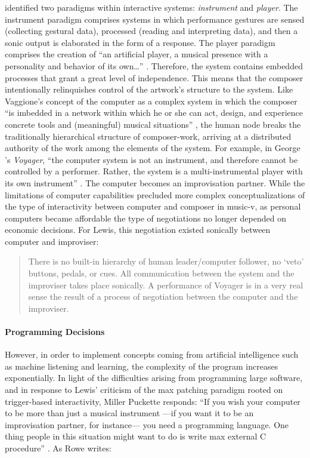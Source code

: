 \citeauthor{Row92:Int} \parencite{Row92:Int} identified two paradigms within interactive systems: \textit{instrument} and \textit{player}. The instrument paradigm comprises systems in which performance gestures are sensed (collecting gestural data), processed (reading and interpreting data), and then a sonic output is elaborated in the form of a response. The player paradigm comprises the creation of ``an artificial player, a musical presence with a personality and behavior of its own\dots'' \parencite[Chapter~1]{Row92:Int}. Therefore, the system contains embedded processes that grant a great level of independence. This means that the composer intentionally relinquishes control of the artwork's structure to the system. Like Vaggione's concept of the computer as a complex system in which the composer ``is imbedded in a network within which he or she can act, design, and experience concrete tools and (meaningful) musical situations'' \parencite{Vag01:Som}, the human node breaks the traditionally hierarchical structure of composer-work, arriving at a distributed authority of the work among the elements of the system. For example, in George \textcite{Lew99:Int}'s \textit{Voyager}, ``the computer system is not an instrument, and therefore cannot be controlled by a performer. Rather, the system is a multi-instrumental player with its own instrument'' \parencite[103]{Lew99:Int}. The computer becomes an improvisation partner. While the limitations of computer capabilities precluded more complex conceptualizations of the type of interactivity between computer and composer in \gls{music-v}, as personal computers became affordable the type of negotiations no longer depended on economic decisions. For Lewis, this  negotiation existed sonically between computer and improviser:

\begin{quote}
	There is no built-in hierarchy of human leader/computer follower, no `veto' buttons, pedals, or cues. All communication between the system and the improviser takes place sonically. A performance of Voyager is in a very real sense the result of a process of negotiation between the computer and the improviser. \parencite[104]{Lew99:Int}
\end{quote}

\paragraph{Programming Decisions}
However, in order to implement concepts coming from artificial intelligence such as machine listening and learning, the complexity of the program increases exponentially. In light of the difficulties arising from programming large software, and in response to Lewis' criticism of the \gls{max} patching paradigm rooted on trigger-based interactivity, Miller Puckette responds: ``If you wish your computer to be more than just a musical instrument ---if you want it to be an improvisation partner, for instance--- you need a programming language. One thing people in this situation might want to do is write \gls{max} external C procedure'' \parencite[8]{Lew93:Put}. As Rowe writes:

